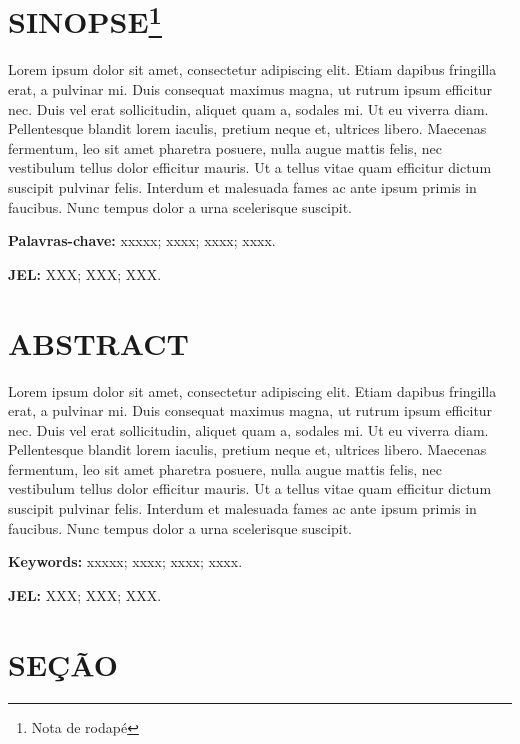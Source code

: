 \documentclass[
  12pt,
  a4paper,
]{td}
\begin{document}


\maketitle

\thispagestyle{fancy}


\section*{SINOPSE\footnote{Nota de rodapé}}

Lorem ipsum dolor sit amet, consectetur adipiscing elit. Etiam dapibus
fringilla erat, a pulvinar mi. Duis consequat maximus magna, ut rutrum
ipsum efficitur nec. Duis vel erat sollicitudin, aliquet quam a, sodales
mi. Ut eu viverra diam. Pellentesque blandit lorem iaculis, pretium
neque et, ultrices libero. Maecenas fermentum, leo sit amet pharetra
posuere, nulla augue mattis felis, nec vestibulum tellus dolor efficitur
mauris. Ut a tellus vitae quam efficitur dictum suscipit pulvinar felis.
Interdum et malesuada fames ac ante ipsum primis in faucibus. Nunc
tempus dolor a urna scelerisque suscipit.

\textbf{Palavras-chave:} xxxxx; xxxx; xxxx; xxxx.

\textbf{JEL:} XXX; XXX; XXX.

\section*{ABSTRACT}

Lorem ipsum dolor sit amet, consectetur adipiscing elit. Etiam dapibus
fringilla erat, a pulvinar mi. Duis consequat maximus magna, ut rutrum
ipsum efficitur nec. Duis vel erat sollicitudin, aliquet quam a, sodales
mi. Ut eu viverra diam. Pellentesque blandit lorem iaculis, pretium
neque et, ultrices libero. Maecenas fermentum, leo sit amet pharetra
posuere, nulla augue mattis felis, nec vestibulum tellus dolor efficitur
mauris. Ut a tellus vitae quam efficitur dictum suscipit pulvinar felis.
Interdum et malesuada fames ac ante ipsum primis in faucibus. Nunc
tempus dolor a urna scelerisque suscipit.

\textbf{Keywords:} xxxxx; xxxx; xxxx; xxxx.

\textbf{JEL:} XXX; XXX; XXX.

\newpage{}

\section{SEÇÃO}
\end{document}
